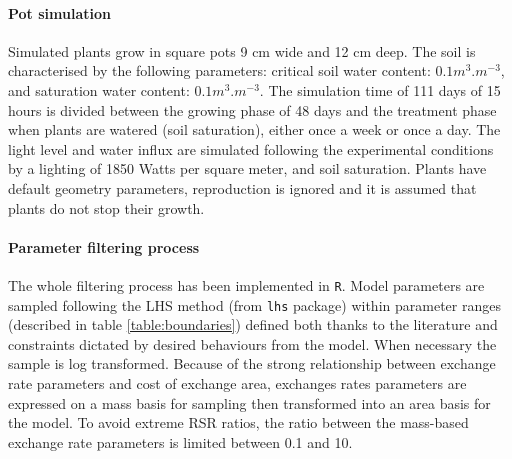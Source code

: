 \paragraph{Pot simulation}
Simulated plants grow in square pots 9 cm wide and 12 cm deep. The soil is characterised by the following parameters: critical soil water content: $0.1 m^3.m^{-3}$, and saturation water content: $0.1 m^3.m^{-3}$. The simulation time of 111 days of 15 hours is divided between the growing phase of 48 days and the treatment phase when plants are watered (soil saturation), either once a week or once a day. The light level and water influx are simulated following the experimental conditions \parencite{peterson_growth_1982} by a lighting of 1850 Watts per square meter, and soil saturation. Plants have default geometry parameters,  reproduction is ignored and it is assumed that plants do not stop their growth.

\paragraph{Parameter filtering process}
The whole filtering process has been implemented in \texttt{R}. Model parameters are sampled following the LHS method (from \texttt{lhs} package) within parameter ranges (described in table \ref{table:boundaries}) defined both thanks to the literature and constraints dictated by desired behaviours from the model. When necessary the sample is log transformed. Because of the strong relationship between exchange rate parameters and cost of exchange area, exchanges rates parameters are expressed on a mass basis for sampling then transformed into an area basis for the model. To avoid extreme RSR ratios, the ratio between the mass-based exchange rate parameters is limited between 0.1 and 10.

